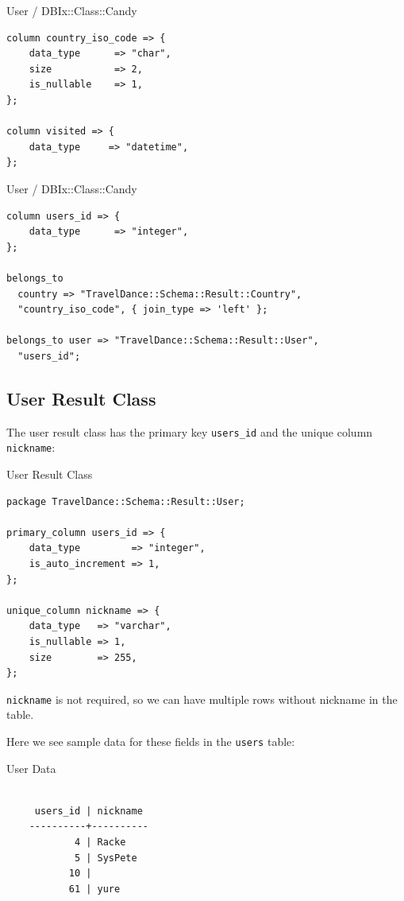 \begin{frame}[fragile]{User / DBIx::Class::Candy}
\begin{lstlisting}
column country_iso_code => {
    data_type      => "char",
    size           => 2,
    is_nullable    => 1,
};

column visited => {
    data_type     => "datetime",
};
\end{lstlisting}
\end{frame}

\begin{frame}[fragile]{User / DBIx::Class::Candy}
\begin{lstlisting}
column users_id => {
    data_type      => "integer",
};

belongs_to
  country => "TravelDance::Schema::Result::Country",
  "country_iso_code", { join_type => 'left' };

belongs_to user => "TravelDance::Schema::Result::User",
  "users_id";
\end{lstlisting}
\end{frame}

\subsection{User Result Class}

The user result class has the primary key \verb|users_id| and the
unique column \verb|nickname|:

\begin{frame}[fragile]{User Result Class}
\begin{lstlisting}
package TravelDance::Schema::Result::User;

primary_column users_id => {
    data_type         => "integer",
    is_auto_increment => 1,
};

unique_column nickname => {
    data_type   => "varchar",
    is_nullable => 1,
    size        => 255,
};
\end{lstlisting}
\end{frame}

\verb|nickname| is not required, so we can have multiple
rows without nickname in the table.

Here we see sample data for these fields in the
\verb|users| table:

\begin{frame}[fragile]{User Data}
\begin{lstlisting}

     users_id | nickname
    ----------+----------
            4 | Racke
            5 | SysPete
           10 |
           61 | yure

\end{lstlisting}
\end{frame}

